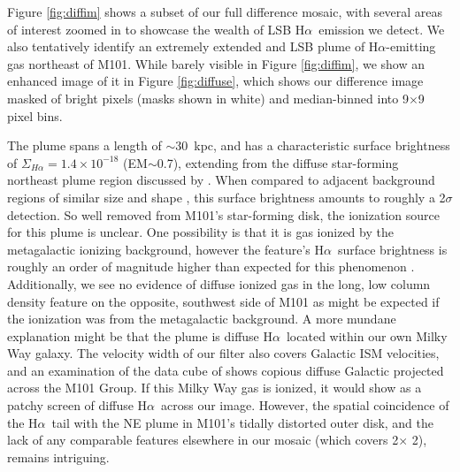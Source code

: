 \documentclass[iop]{emulateapj}
\newcommand{\ha}{H$\alpha$}
\begin{document}
Figure \ref{fig:diffim} shows a subset of our full difference mosaic,
with several areas of interest zoomed in to showcase the wealth of LSB
\ha \ emission we detect.  We also tentatively identify an extremely
extended and LSB plume of \ha-emitting gas northeast of M101.  While
barely visible in Figure \ref{fig:diffim}, we show an enhanced image
of it in Figure \ref{fig:diffuse}, which shows our difference image
masked of bright pixels (masks shown in white) and median-binned into
9$\times$9 pixel bins.

The plume spans a length of $\sim$30~kpc, and has a characteristic
surface brightness of $\Sigma_{H\alpha} = 1.4 \times 10^{-18}$
(EM$\sim$0.7), extending from the diffuse star-forming northeast plume
region discussed by \citet{mihos13}.  When compared to adjacent
background regions of similar size and shape \citep[see][]{rudick10,
  watkins14}, this surface brightness amounts to roughly a 2$\sigma$
detection.  So well removed from M101's star-forming disk, the
ionization source for this plume is unclear.  One possibility is that
it is gas ionized by the metagalactic ionizing background, however the
feature's \ha \ surface brightness is roughly an order of magnitude
higher than expected for this phenomenon \citep{vogel95}.
Additionally, we see no evidence of diffuse ionized gas \citep[DIG;
  see, e.g.,][]{reynolds90, haffner09} in the
long, low column density  feature on the opposite, southwest
side of M101 \citep{mihos12} as might be expected if the ionization
was from the metagalactic background.  A more mundane explanation
might be that the plume is diffuse \ha \ located within our own Milky
Way galaxy.  The velocity width of our filter also covers Galactic ISM
velocities, and an examination of the  data cube of
\citet{mihos12} shows copious diffuse Galactic  projected
across the M101 Group.  If this Milky Way gas is ionized, it would
show as a patchy screen of diffuse \ha \ across our image.  However,
the spatial coincidence of the \ha \ tail with the NE plume in M101's
tidally distorted outer disk, and the lack of any comparable features
elsewhere in our mosaic (which covers 2\arcdeg $\times$ 2\arcdeg),
remains intriguing.
\end{document}
